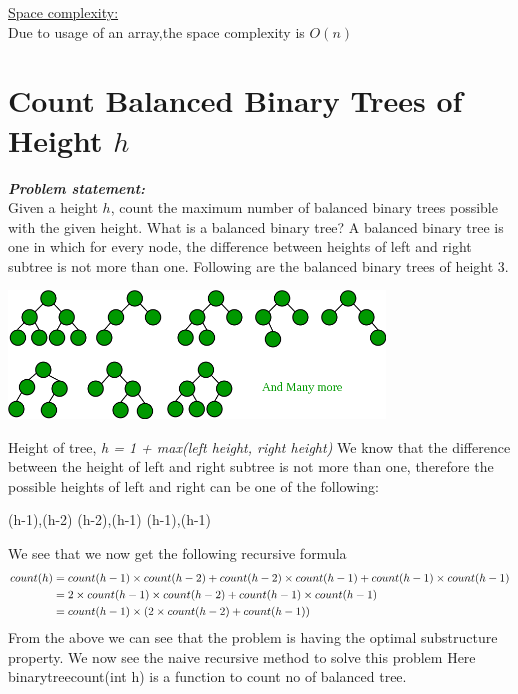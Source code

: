 \documentclass[12pt]{book}
\begin{document}
\underline{Space complexity:}\\
Due to usage of an array,the space complexity is $O(n)$\\

\chapter{Count Balanced Binary Trees of Height $h$}

\textbf{\textit{Problem statement:}}\\

Given a height $h$, count the maximum number of balanced binary trees possible with the given height.\newline
What is a balanced binary tree?\newline
A balanced binary tree is one in which for every node, the difference between heights of left and right subtree is not more than one.\newline\newline
Following are the balanced binary trees of height 3.
\newline
\begin{center}
    \includegraphics[width = 10cm]{Balanced_Binary_Tree-1.png}    
\end{center}
Height of tree, \textit{h = 1 + max(left height, right height)}\newline
We know that the difference between the height of left and right subtree is not more than one, therefore the possible heights of left and right can be one of the following:\newline
\begin{center}
(h-1),(h-2)\newline
(h-2),(h-1)\newline
(h-1),(h-1)\newline    
\end{center}

    We see that we now get the following recursive formula
\begin{align*}
count(h) &= count(h-1)\times count(h-2) + count(h-2)\times count(h-1) + count(h-1)\times count(h-1)\\
&=2\times count(h-1)\times count(h-2) + count(h-1)\times count(h-1)\\
&= count(h-1)\times(2\times count(h-2) + count(h-1))\newline
\end{align*}
From the above we can see that the problem is having the optimal substructure property.
We now see the naive recursive method to solve this problem\newline\newline
Here binarytreecount(int h) is a function to count no of balanced tree.\newline
\end{document}
